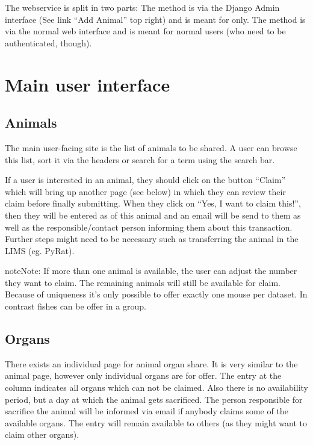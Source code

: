 \documentclass[letterpaper,10pt,openany,oneside,english]{sphinxmanual}
\begin{document}
The webservice is split in two parts: The  method is via the Django Admin interface (See link
“Add Animal” top right) and is meant for  only.
The  method is via the normal web interface and is meant for normal users (who need to be
authenticated, though).


\section{Main user interface}
\label{\detokenize{index:main-user-interface}}

\subsection{Animals}
\label{\detokenize{index:animals}}
The main user-facing site is the list of animals to be shared. A user can browse this list, sort it
via the headers or search for a term using the search bar.

\noindent{}

If a user is interested in an animal, they should click on the button “Claim” which will bring up
another page (see below) in which they can review their claim before finally submitting. When they
click on “Yes, I want to claim this!”, then they will be entered as  of this animal and
an email will be send to them as well as the responsible/contact person informing them about this
transaction. Further steps might need to be necessary such as transferring the animal in the LIMS
(eg. PyRat).

\begin{sphinxadmonition}{note}{Note:}
If more than one animal is available, the user can adjust the number they want to claim.
The remaining animals will still be available for claim. Because of uniqueness it’s only
possible to offer exactly one mouse per dataset. In contrast fishes can be offer in a group.
\end{sphinxadmonition}

\noindent{}


\subsection{Organs}
\label{\detokenize{index:organs}}
There exists an individual page for animal organ share. It is very similar to the animal page,
however only individual organs are for offer. The entry at the column  indicates
all organs which can not be claimed. Also there is no availability period, but a day at
which the animal gets sacrificed. The person responsible for sacrifice the animal will be informed via
email if anybody claims some of the available organs. The entry will remain available to others (as
they might want to claim other organs).
\end{document}
